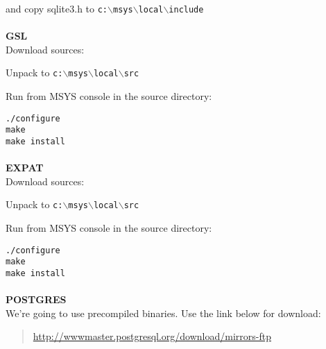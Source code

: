 and copy sqlite3.h to \texttt{c:$\backslash$msys$\backslash$local$\backslash$include}

\paragraph{}\textbf{GSL}\\

Download sources:

	\begin{quotation}
	\end{quotation}

Unpack to \texttt{c:$\backslash$msys$\backslash$local$\backslash$src}

Run from MSYS console in the source directory:

\begin{verbatim}
./configure
make
make install
\end{verbatim}

\paragraph{}\textbf{EXPAT}\\

Download sources:

	\begin{quotation}
	\end{quotation}

Unpack to \texttt{c:$\backslash$msys$\backslash$local$\backslash$src}

Run from MSYS console in the source directory:

\begin{verbatim}
./configure
make
make install
\end{verbatim}

\paragraph{}\textbf{POSTGRES}\\

We're going to use precompiled binaries. Use the link below for download:

	\begin{quotation}
\url{http://wwwmaster.postgresql.org/download/mirrors-ftp}
	\end{quotation}


